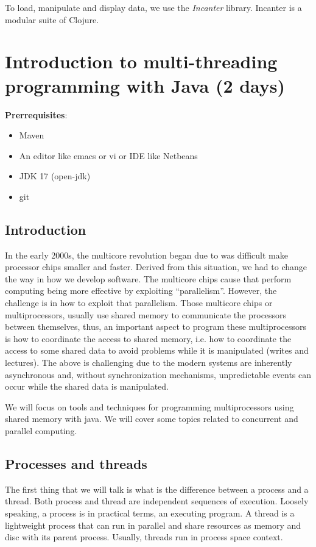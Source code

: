 \documentclass[openany, a4paper]{book}
\theoremstyle{break}
\theoremstyle{example}
\theoremstyle{note}
\theoremstyle{break}
\theoremstyle{exercise}
\begin{document}
To load, manipulate and display data, we use the \emph{Incanter} library. Incanter
is a modular suite of Clojure.


\chapter{Introduction to multi-threading programming with Java (2 days)}
\label{sec:org4fd468b}
\textbf{Prerrequisites}:
\begin{itemize}
\item Maven
\item An editor like emacs or vi or IDE like Netbeans
\item JDK 17 (open-jdk)
\item git
\end{itemize}

\section{Introduction}
\label{sec:orgf262823}

In the early 2000s, the multicore revolution began due to was difficult make
processor chips smaller and faster. Derived from this situation, we had to
change the way in how we develop software. The multicore chips cause that
perform computing being more effective by exploiting
``parallelism''. However, the challenge is in how to exploit that
parallelism. Those multicore chips or multiprocessors, usually use shared
memory to communicate the processors between themselves, thus, an important
aspect to program these multiprocessors is how to coordinate the access to
shared memory, i.e. how to coordinate the access to some shared data to avoid
problems while it is manipulated (writes and lectures). The above is
challenging due to the modern systems are inherently asynchronous and,
without synchronization mechanisms, unpredictable events can occur while the
shared data is manipulated.

We will focus on tools and techniques for programming multiprocessors using
shared memory with java. We will cover some topics related to concurrent and
parallel computing.


\section{Processes and threads}
\label{sec:orge73cd70}

The first thing that we will talk is what is the difference between a process
and a thread. Both process and thread are independent sequences of
execution. Loosely speaking, a process is in practical terms, an executing
program. A thread is a lightweight process that can run in parallel and share
resources as memory and disc with its parent process. Usually, threads run in
process space context.
\end{document}
